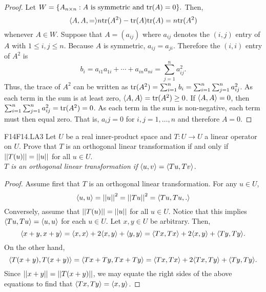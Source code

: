 \documentclass[../AlgebraQualSolutions.tex]{subfiles}
\begin{document}
    \begin{proof}
        Let $W = \{A_{n\times n}: A \textrm{ is symmetric  and } \tr(A) = 0\}.$ Then,
            \[\ip{A,A} = n\tr(A^2) - \tr(A)\tr(A) = n\tr(A^2)\]
        whenever $A \in W$. Suppose that $A = (a_{ij})$ where $a_{ij}$ denotes the $(i,j)$ entry of $A$ with $1\leq i,j \leq n$. Because $A$ is symmetric, $a_{ij} = a_{ji}$. Therefore the $(i,i)$ entry of $A^2$ is
            \[b_i = a_{i1}a_{1i} + \cdots + a_{in}a_{ni} = \sum_{j=1}^n a_{ij}^2. \]
        Thus, the trace of $A^2$ can be written as $\tr(A^2) = \sum_{i=1}^n b_i = \sum_{i=1}^n \sum_{j=1}^n a_{ij}^2$. As each term in the sum is at least zero, $\ip{A}{A} = \tr(A^2) \geq 0$. If $\ip{A}{A} = 0$, then $\sum_{i=1}^n \sum_{j=1}^n a_{ij}^2 = \tr(A^2) = 0$. As each term in the sum is non-negative, each term must then equal zero. That is, $a_ij = 0$ for $i,j = 1, \ldots, n$ and therefore $A = 0$.
    \end{proof}
    
    \begin{prob}{F14}{F14.LA3}
        Let $U$ be a real inner-product space and $T: U \to U$ a linear operator on $U$. Prove that $T$ is an orthogonal linear transformation if and only if $\norm[T(u)] = \norm[u]$ for all $u \in U$.\\
    
        \emph{$T$ is an orthogonal linear transformation if $\ip{u}{v} = \ip{Tu}{Tv}$}.
    \end{prob}
    
    \begin{proof}
        Assume first that $T$ is an orthogonal linear transformation. For any $u \in U$,
            \[\ip{u}{u} = \norm[u]^2 = \norm[Tu]^2 = \ip{Tu,Tu}.\]
        Conversely, assume that $\norm[T(u)] = \norm[u]$ for all $u \in U$. Notice that this implies $\ip{Tu}{Tu} = \ip{u}{u}$ for each $u \in U$. Let $x, y \in U$ be arbitrary. Then,
            \[\ip{x+y}{x+y} = \ip{x}{x} + 2\ip{x}{y} + \ip{y}{y} = \ip{Tx}{Tx} + 2\ip{x}{y} + \ip{Ty}{Ty}.\]
        On the other hand,
            \[\ip{T(x+y)}{T(x+y)} = \ip{Tx + Ty}{Tx + Ty} = \ip{Tx}{Tx} + 2\ip{Tx}{Ty} + \ip{Ty}{Ty}.\]
        Since $\norm[x + y] = \norm[T(x+y)]$, we may equate the right sides of the above equations to find that $\ip{Tx}{Ty} = \ip{x}{y}$.
    \end{proof}
\end{document}
